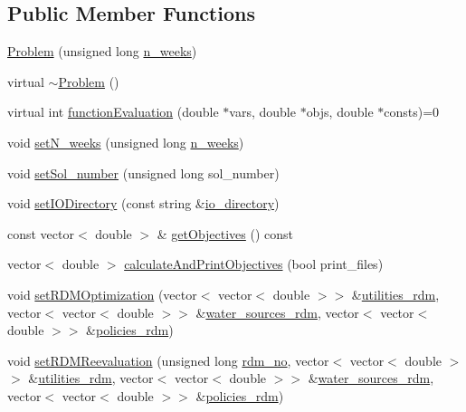 \subsection*{Public Member Functions}
\begin{DoxyCompactItemize}
\item 
\mbox{\hyperlink{classProblem_a41939e01b382197124fcd9f5e8c7520d}{Problem}} (unsigned long \mbox{\hyperlink{classProblem_ac7513bb0ecdfa4bbb7d2ada3595d71ec}{n\+\_\+weeks}})
\item 
virtual \mbox{\hyperlink{classProblem_a839a525ed01c34d57fff42583003d3e7}{$\sim$\+Problem}} ()
\item 
virtual int \mbox{\hyperlink{classProblem_acd924a80df4422c5199748c714e9405c}{function\+Evaluation}} (double $\ast$vars, double $\ast$objs, double $\ast$consts)=0
\item 
void \mbox{\hyperlink{classProblem_a1ea4a3d52209fa3f284a4060fb6fa3ab}{set\+N\+\_\+weeks}} (unsigned long \mbox{\hyperlink{classProblem_ac7513bb0ecdfa4bbb7d2ada3595d71ec}{n\+\_\+weeks}})
\item 
void \mbox{\hyperlink{classProblem_a855eaf9a98eadfab131d598b51df6d66}{set\+Sol\+\_\+number}} (unsigned long sol\+\_\+number)
\item 
void \mbox{\hyperlink{classProblem_a188254a95b04bf4ed67e66262ea342e9}{set\+I\+O\+Directory}} (const string \&\mbox{\hyperlink{classProblem_ac58848a0d808cf040c3fb3676b4a236f}{io\+\_\+directory}})
\item 
const vector$<$ double $>$ \& \mbox{\hyperlink{classProblem_a55da26d3bd669809b992fff823b8ef9b}{get\+Objectives}} () const
\item 
vector$<$ double $>$ \mbox{\hyperlink{classProblem_afdbe1eb541cc11071478da57b35e21b0}{calculate\+And\+Print\+Objectives}} (bool print\+\_\+files)
\item 
void \mbox{\hyperlink{classProblem_a98115002e741e9220f7aa6bae0cb179c}{set\+R\+D\+M\+Optimization}} (vector$<$ vector$<$ double $>$$>$ \&\mbox{\hyperlink{classProblem_aa4f6db22580c8d8a941e83556f4f5208}{utilities\+\_\+rdm}}, vector$<$ vector$<$ double $>$$>$ \&\mbox{\hyperlink{classProblem_ace43e5306285f0d91a199a4bd5a38922}{water\+\_\+sources\+\_\+rdm}}, vector$<$ vector$<$ double $>$$>$ \&\mbox{\hyperlink{classProblem_a63d49161a5d6d98e26cd218d90a13bae}{policies\+\_\+rdm}})
\item 
void \mbox{\hyperlink{classProblem_abaf4b2698552702ccf709bf07ed76ca3}{set\+R\+D\+M\+Reevaluation}} (unsigned long \mbox{\hyperlink{classProblem_a9e780729b6be5229c5bfa1e38c99cfa5}{rdm\+\_\+no}}, vector$<$ vector$<$ double $>$$>$ \&\mbox{\hyperlink{classProblem_aa4f6db22580c8d8a941e83556f4f5208}{utilities\+\_\+rdm}}, vector$<$ vector$<$ double $>$$>$ \&\mbox{\hyperlink{classProblem_ace43e5306285f0d91a199a4bd5a38922}{water\+\_\+sources\+\_\+rdm}}, vector$<$ vector$<$ double $>$$>$ \&\mbox{\hyperlink{classProblem_a63d49161a5d6d98e26cd218d90a13bae}{policies\+\_\+rdm}})

\end{DoxyCompactItemize}
